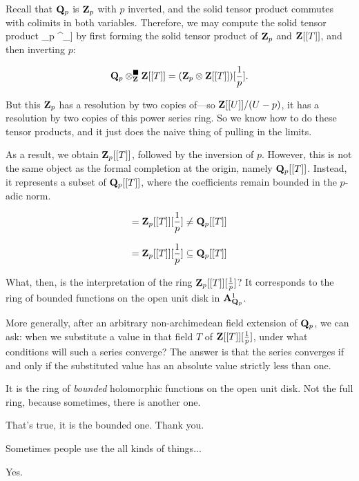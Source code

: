 %
Recall that $\mathbf Q_p$ is $\mathbf Z_p$ with $p$ inverted, and the solid tensor product commutes with colimits in both variables. Therefore, we may compute the solid tensor product \Q_p \tnsr^\solid_\Z \Z[[T]] by first forming the solid tensor product of $\mathbf Z_p$ and $\mathbf Z[[T]]$, and then inverting $p$:

\begin{align*}
\mathbf Q_p \otimes^\blacksquare_\mathbf Z \mathbf Z[[T]] = (\mathbf Z_p \otimes \mathbf Z[[T]])[\frac{1}{p}].
\end{align*}

But this $\mathbf Z_p$ has a resolution by two copies of---so $\mathbf Z[[U]]/(U-p)$, it has a resolution by two copies of this power series ring. So we know how to do these tensor products, and it just does the naive thing of pulling in the limits.

As a result, we obtain $\mathbf Z_p[[T]]$, followed by the inversion of $p$. However, this is not the same object as the formal completion at the origin, namely $\mathbf Q_p[[T]]$. Instead, it represents a subset of $\mathbf Q_p[[T]]$, where the coefficients remain bounded in the $p$-adic norm.

\begin{align*}
= \mathbf Z_p [[T]][\frac{1}{p}] \neq \mathbf Q_p[[T]]
\end{align*}

\begin{align*}
= \mathbf Z_p [[T]][\frac{1}{p}] \subseteq \mathbf Q_p[[T]]
\end{align*}

What, then, is the interpretation of the ring $\mathbf Z_p [[T]][\frac{1}{p}]$? It corresponds to the ring of bounded functions on the open unit disk in $\mathbf A^1_{\mathbf Q_p}$.

More generally, after an arbitrary non-archimedean field extension of $\mathbf Q_p$, we can ask: when we substitute a value in that field $T$ of $\mathbf Z[[T]][\frac{1}{p}]$, under what conditions will such a series converge? The answer is that the series converges if and only if the substituted value has an absolute value strictly less than one.

\gabber It is the ring of \emph{bounded} holomorphic functions on the open unit disk. Not the full ring, because sometimes, there is another one. 

\clausen That's true, it is the bounded one. Thank you.

\gabber Sometimes people use the all kinds of things...

\clausen Yes.

